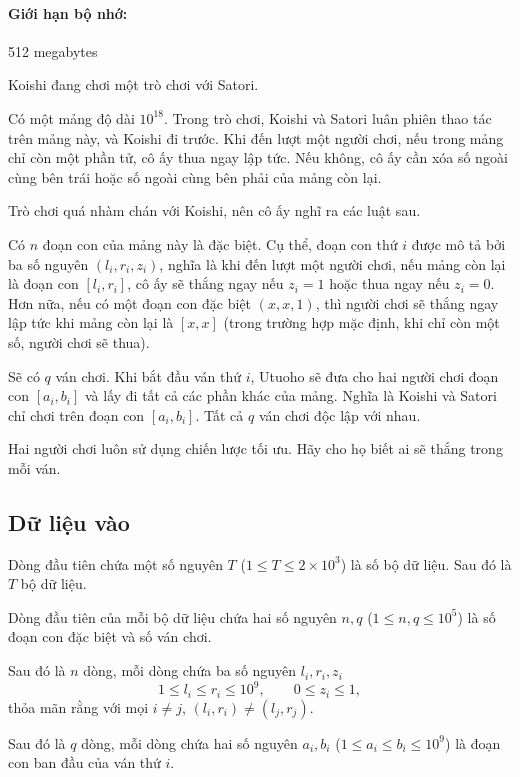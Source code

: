 \documentclass[11pt]{article}
\begin{document}
\paragraph{Giới hạn bộ nhớ:} 512 megabytes

Koishi đang chơi một trò chơi với Satori.

Có một mảng độ dài \(10^{18}\). Trong trò chơi, Koishi và Satori luân phiên
thao tác trên mảng này, và Koishi đi trước. Khi đến lượt một người chơi, nếu
trong mảng chỉ còn một phần tử, cô ấy thua ngay lập tức. Nếu không, cô ấy cần
xóa số ngoài cùng bên trái hoặc số ngoài cùng bên phải của mảng còn lại.

Trò chơi quá nhàm chán với Koishi, nên cô ấy nghĩ ra các luật sau.

Có \(n\) đoạn con của mảng này là đặc biệt. Cụ thể, đoạn con thứ \(i\) được
mô tả bởi ba số nguyên \((l_i,r_i,z_i)\), nghĩa là khi đến lượt một người
chơi, nếu mảng còn lại là đoạn con \([l_i,r_i]\), cô ấy sẽ thắng ngay nếu
\(z_i=1\) hoặc thua ngay nếu \(z_i=0\). Hơn nữa, nếu có một đoạn con đặc biệt
\((x,x,1)\), thì người chơi sẽ thắng ngay lập tức khi mảng còn lại là
\([x,x]\) (trong trường hợp mặc định, khi chỉ còn một số, người chơi sẽ
thua).

Sẽ có \(q\) ván chơi. Khi bắt đầu ván thứ \(i\), Utuoho sẽ đưa cho hai người
chơi đoạn con \([a_i,b_i]\) và lấy đi tất cả các phần khác của mảng. Nghĩa
là Koishi và Satori chỉ chơi trên đoạn con \([a_i,b_i]\). Tất cả \(q\) ván
chơi độc lập với nhau.

Hai người chơi luôn sử dụng chiến lược tối ưu. Hãy cho họ biết ai sẽ thắng
trong mỗi ván.

\subsection*{Dữ liệu vào}

Dòng đầu tiên chứa một số nguyên \(T\) (\(1\le T\le 2\times 10^3\)) là số bộ
dữ liệu. Sau đó là \(T\) bộ dữ liệu.

Dòng đầu tiên của mỗi bộ dữ liệu chứa hai số nguyên \(n,q\)
(\(1\le n,q\le 10^5\)) là số đoạn con đặc biệt và số ván chơi.

Sau đó là \(n\) dòng, mỗi dòng chứa ba số nguyên \(l_i,r_i,z_i\)
\[
  1\le l_i\le r_i\le 10^9,\qquad 0\le z_i\le 1,
\]
thỏa mãn rằng với mọi \(i\ne j\), \((l_i,r_i)\ne(l_j,r_j)\).

Sau đó là \(q\) dòng, mỗi dòng chứa hai số nguyên \(a_i,b_i\)
(\(1\le a_i\le b_i\le 10^9\)) là đoạn con ban đầu của ván thứ \(i\).
\end{document}
